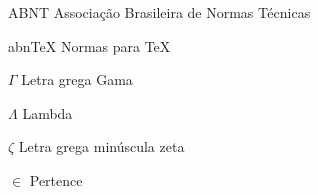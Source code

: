 \documentclass[
	12pt,					%
	openright,				%
	twoside,					%
	a4paper,					%
	english,					%
	portuges					%
	]{abntex2}
\begin{document}
\frenchspacing

\pretextual



\imprimirfolhaderosto*

% 

%

%

%

%



\listoffigures*
\cleardoublepage

\listoftables*
\cleardoublepage

\begin{siglas}
  \item[ABNT] Associação Brasileira de Normas Técnicas
  \item[abnTeX] Normas para TeX
\end{siglas}

\begin{simbolos}
  \item[$ \Gamma $] Letra grega Gama
  \item[$ \Lambda $] Lambda
  \item[$ \zeta $] Letra grega minúscula zeta
  \item[$ \in $] Pertence
\end{simbolos}

\tableofcontents*
\cleardoublepage

\textual
\setcounter{page}{1}
\end{document}
